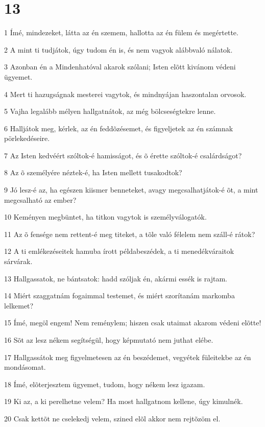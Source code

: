 \chapter{13}

\par 1 Ímé, mindezeket, látta az én szemem, hallotta az én fülem és megértette.
\par 2 A mint ti tudjátok, úgy tudom én is, és nem vagyok alábbvaló nálatok.
\par 3 Azonban én a Mindenhatóval akarok szólani; Isten elõtt kivánom védeni ügyemet.
\par 4 Mert ti hazugságnak mesterei vagytok, és mindnyájan haszontalan orvosok.
\par 5 Vajha legalább mélyen hallgatnátok, az még bölcseségtekre lenne.
\par 6 Halljátok meg, kérlek, az én feddõzésemet, és figyeljetek az én számnak pörlekedéseire.
\par 7 Az Isten kedvéért szóltok-é hamisságot, és õ érette szóltok-é csalárdságot?
\par 8 Az õ személyére néztek-é, ha Isten mellett tusakodtok?
\par 9 Jó lesz-é az, ha egészen kiismer benneteket, avagy megcsalhatjátok-é õt, a mint megcsalható az ember?
\par 10 Keményen megbüntet, ha titkon vagytok is személyválogatók.
\par 11 Az õ fensége nem rettent-é meg titeket, a tõle való félelem nem száll-é rátok?
\par 12 A ti emlékezéseitek hamuba írott példabeszédek, a ti menedékváraitok sárvárak.
\par 13 Hallgassatok, ne bántsatok: hadd szóljak én, akármi essék is rajtam.
\par 14 Miért szaggatnám fogaimmal testemet, és miért szorítanám markomba lelkemet?
\par 15 Ímé, megöl engem! Nem reménylem; hiszen csak utaimat akarom védeni elõtte!
\par 16 Sõt az lesz nékem segítségül, hogy képmutató nem juthat elébe.
\par 17 Hallgassátok meg figyelmetesen az én beszédemet, vegyétek füleitekbe az én mondásomat.
\par 18 Ímé, elõterjesztem ügyemet, tudom, hogy nékem lesz igazam.
\par 19 Ki az, a ki perelhetne velem? Ha most hallgatnom kellene, úgy kimulnék.
\par 20 Csak kettõt ne cselekedj velem, szined elõl akkor nem rejtõzöm el.

